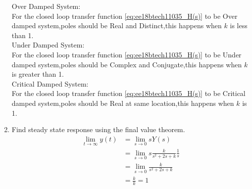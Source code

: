 \begin{enumerate}[label=\thesubsection.\arabic*.,ref=\thesubsection.\theenumi]
Over Damped System:\\
For the closed loop transfer function \eqref{eq:ee18btech11035_H(s)} to be Over damped system,poles should be Real and Distinct,this happens when $k$ is less than 1.\\

Under Damped System:\\
For the closed loop transfer function \eqref{eq:ee18btech11035_H(s)} to be Under damped system,poles should be Complex and Conjugate,this happens when $k$ is greater than 1.\\

Critical Damped System:\\
For the closed loop transfer function \eqref{eq:ee18btech11035_H(s)} to be Critical damped system,poles should be Real at same location,this happens when $k$ is 1.\\

\item  Find steady state response using the final value theorem.\\
\solution 
\begin{align}
\lim_{t\to\infty} y(t)&=\lim_{s\to0} sY(s)\\
&=\lim_{s\to0} s\frac{k}{s^2+2s+k}\frac{1}{s}\\
&=\lim_{s\to0} \frac{k}{s^2+2s+k}\\
&=\frac{k}{k}=1
\end{align}

\end{enumerate}
